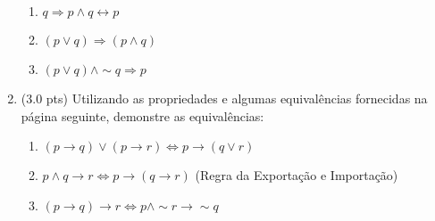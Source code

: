 \documentclass[12pt]{article}
\begin{document}
\begin{enumerate}
\begin{enumerate}


\item $q \Rightarrow p \wedge q \leftrightarrow p$

\item $(p \vee q) \Rightarrow (p \wedge q)$

\item $(p \vee q) \wedge \sim q \Rightarrow p$


\end{enumerate}


\item (3.0 pts) Utilizando as propriedades e algumas equivalências
fornecidas na página seguinte, demonstre as equivalências:

\begin{enumerate}
\setlength{\itemsep}{-2pt}


\item  $(p \rightarrow q) \vee (p \rightarrow r) \Leftrightarrow p  \rightarrow  (q \vee r) $ %


\item $p \wedge q \rightarrow r \Leftrightarrow p \rightarrow (q \rightarrow r) $  (Regra da Exportação e Importação) %


\item $(p \rightarrow q) \rightarrow r \Leftrightarrow p \wedge \sim r \rightarrow \sim q $


\end{enumerate}
\end{enumerate}
\end{document}
